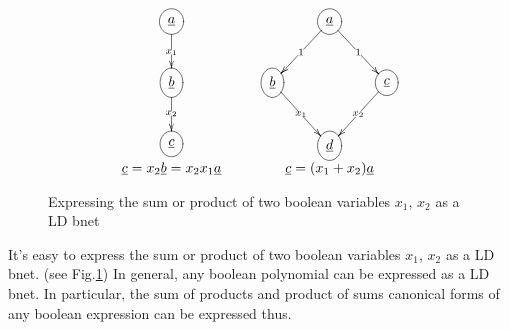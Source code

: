 \begin{figure}[h!]
$$
\begin{array}{ccc}
\xymatrix{
\Circle{\rva}
\ar[d]|{x_1}
\\
\Circle{\rvb}
\ar[d]|{x_2}
\\
\Circle{\rvc}
}
&\;\;\;&
\xymatrix{
&\Circle{\rva}\ar[dl]|1
\ar[dr]|1
\\
\Circle{\rvb}\ar[dr]|{x_1}
&&\Circle{\rvc}\ar[dl]|{x_2}
\\
&\Circle{\rvd}
}
\\
\rvc=x_2\rvb=x_2x_1\rva
&&
\rvc= (x_1 + x_2)\rva
\end{array}
$$
\caption{Expressing the sum or product 
of two boolean variables $x_1$, $x_2$ 
as a LD bnet}
\label{fig-bdd-and-or}
\end{figure}

It's easy to  express the sum or product 
of two boolean variables $x_1$, $x_2$ 
as a LD bnet.
(see Fig.\ref{fig-bdd-and-or})
In general, any boolean polynomial
can be expressed as a LD bnet. In particular, the sum of products and product of sums
canonical forms
of any boolean expression can be expressed 
thus.